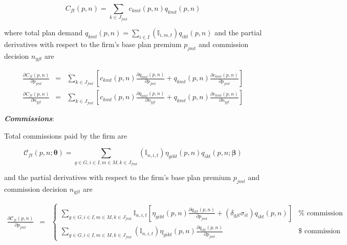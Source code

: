 \documentclass[12pt]{article}
\begin{document}
		$$
		C_{ft}(\textit{p},\textit{n}) = \sum_{k \in J_{fmt}} c_{kmt}(\textit{p},\textit{n}) q_{kmt}(\textit{p},\textit{n})
		$$	
	
\noindent where total plan demand $q_{kmt}(\textit{p},\textit{n}) = \sum_{i\in I} \left(\mathbb{I}_{i,m,t} \right) q_{ikt}(\textit{p},\textit{n})$  and the partial derivatives with respect to the firm's base plan premium $p_{jmt}$ and commission decision $n_{gjt}$ are 		
	
		\vspace{-0.4in}
		\begin{eqnarray*}
		\frac{\partial C_{ft}(\textit{p},\textit{n})}{\partial p_{jmt}} &=& \sum_{k \in J_{fmt}} \left[ c_{kmt}(\textit{p},\textit{n})\frac{ \partial q_{kmt}(\textit{p},\textit{n})}{\partial p_{jmt}}   +  q_{kmt}(\textit{p},\textit{n})\frac{ \partial c_{kmt}(\textit{p},\textit{n})}{\partial p_{jmt}} \right] \\
		\frac{\partial C_{ft}(\textit{p},\textit{n})}{\partial n_{gjt}} &=& \sum_{k \in J_{fmt}} \left[ c_{kmt}(\textit{p},\textit{n})\frac{ \partial q_{kmt}(\textit{p},\textit{n})}{\partial n_{gjt}}   +  q_{kmt}(\textit{p},\textit{n})\frac{ \partial c_{kmt}(\textit{p},\textit{n})}{\partial n_{gjt}} \right]
		\end{eqnarray*}

	\vspace{-0.1in}
	
\noindent \textit{\bf Commissions}:
	
\noindent Total commissions paid by the firm are	
	
	\vspace{-0.3in}		
	
		$$
		\mathcal{C}_{ft}(\textit{p},\textit{n};\boldsymbol{\theta}) = \sum_{g \in G, i \in I, m \in M, k \in J_{fmt}} \left( \mathbb{I}_{n,i,t} \right)   \eta_{gikt}(\textit{p},\textit{n}) q_{ikt}(\textit{p},\textit{n};\boldsymbol{\beta})
		$$	
	
			
	
\noindent and the partial derivatives with respect to the firm's base plan premium $p_{jmt}$ and commission decision $n_{gjt}$ are 			
	
	
	
	
\vspace{-0.4in}		
		
		\begin{eqnarray*}
		\frac{\partial \mathcal{C}_{ft}(\textit{p},\textit{n})}{\partial p_{jmt}} &=& \begin{cases} \sum_{g \in G, i \in I,m \in M, k \in J_{fmt}} \mathbb{I}_{n,i,t} \left[ \eta_{gikt}(\textit{p},\textit{n}) \frac{ \partial q_{ikt}(\textit{p},\textit{n})}{\partial p_{jmt}} +  \left(\delta_{gjt} \sigma_{it} \right)  q_{ikt}(\textit{p},\textit{n})  \right] &  \mathrm{\% \,\, commission} \\
		  \sum_{g \in G, i \in I, m \in M, k \in J_{fmt}} \left( \mathbb{I}_{n,i,t}\right) \eta_{gikt}(\textit{p},\textit{n}) \frac{ \partial q_{ikt}(\textit{p},\textit{n})}{\partial p_{jmt}}  & \mathrm{\$ \,\, commission}
		\end{cases}
		\end{eqnarray*}
		
\end{document}
